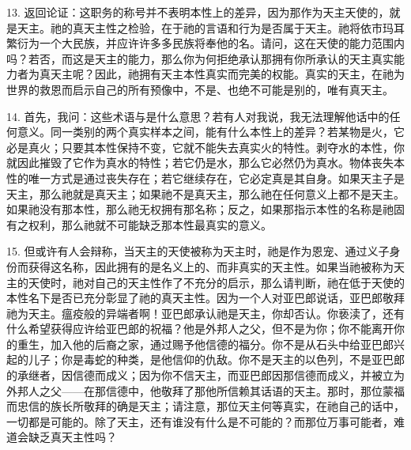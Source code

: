 13. 返回论证：这职务的称号并不表明本性上的差异，因为那作为天主天使的，就是天主。祂的真天主性之检验，在于祂的言语和行为是否属于天主。祂将依市玛耳繁衍为一个大民族，并应许许多多民族将奉他的名。请问，这在天使的能力范围内吗？若否，而这是天主的能力，那么你为何拒绝承认那拥有你所承认的天主真实能力者为真天主呢？因此，祂拥有天主本性真实而完美的权能。真实的天主，在祂为世界的救恩而启示自己的所有预像中，不是、也绝不可能是别的，唯有真天主。\par

14. 首先，我问：这些术语与是什么意思？若有人对我说，我无法理解他话中的任何意义。同一类别的两个真实样本之间，能有什么本性上的差异？若某物是火，它必是真火；只要其本性保持不变，它就不能失去真实火的特性。剥夺水的本性，你就因此摧毁了它作为真水的特性；若它仍是水，那么它必然仍为真水。物体丧失本性的唯一方式是通过丧失存在；若它继续存在，它必定真是其自身。如果天主子是天主，那么祂就是真天主；如果祂不是真天主，那么祂在任何意义上都不是天主。如果祂没有那本性，那么祂无权拥有那名称；反之，如果那指示本性的名称是祂固有之权利，那么祂就不可能缺乏那本性最真实的意义。\par

15. 但或许有人会辩称，当天主的天使被称为天主时，祂是作为恩宠、通过义子身份而获得这名称，因此拥有的是名义上的、而非真实的天主性。如果当祂被称为天主的天使时，祂对自己的天主性作了不充分的启示，那么请判断，祂在低于天使的本性名下是否已充分彰显了祂的真天主性。因为一个人对亚巴郎说话，亚巴郎敬拜祂为天主。瘟疫般的异端者啊！亚巴郎承认祂是天主，你却否认。你亵渎了，还有什么希望获得应许给亚巴郎的祝福？他是外邦人之父，但不是为你；你不能离开你的重生，加入他的后裔之家，通过赐予他信德的福分。你不是从石头中给亚巴郎兴起的儿子；你是毒蛇的种类，是他信仰的仇敌。你不是天主的以色列，不是亚巴郎的承继者，因信德而成义；因为你不信天主，而亚巴郎因那信德而成义，并被立为外邦人之父——在那信德中，他敬拜了那他所信赖其话语的天主。那时，那位蒙福而忠信的族长所敬拜的确是天主；请注意，那位天主何等真实，在祂自己的话中，一切都是可能的。除了天主，还有谁没有什么是不可能的？而那位万事可能者，难道会缺乏真天主性吗？\par

